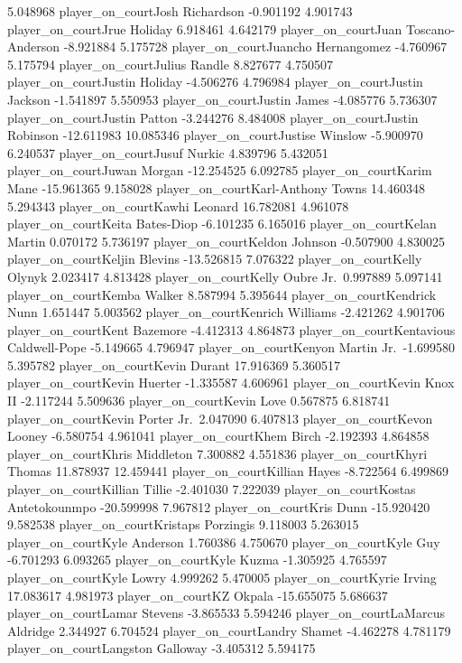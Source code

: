 \documentclass[
  landscape]{article}
\begin{document}
5.048968 player\_on\_courtJosh Richardson -0.901192 4.901743
player\_on\_courtJrue Holiday 6.918461 4.642179 player\_on\_courtJuan
Toscano-Anderson -8.921884 5.175728 player\_on\_courtJuancho Hernangomez
-4.760967 5.175794 player\_on\_courtJulius Randle 8.827677 4.750507
player\_on\_courtJustin Holiday -4.506276 4.796984
player\_on\_courtJustin Jackson -1.541897 5.550953
player\_on\_courtJustin James -4.085776 5.736307 player\_on\_courtJustin
Patton -3.244276 8.484008 player\_on\_courtJustin Robinson -12.611983
10.085346 player\_on\_courtJustise Winslow -5.900970 6.240537
player\_on\_courtJusuf Nurkic 4.839796 5.432051 player\_on\_courtJuwan
Morgan -12.254525 6.092785 player\_on\_courtKarim Mane -15.961365
9.158028 player\_on\_courtKarl-Anthony Towns 14.460348 5.294343
player\_on\_courtKawhi Leonard 16.782081 4.961078 player\_on\_courtKeita
Bates-Diop -6.101235 6.165016 player\_on\_courtKelan Martin 0.070172
5.736197 player\_on\_courtKeldon Johnson -0.507900 4.830025
player\_on\_courtKeljin Blevins -13.526815 7.076322
player\_on\_courtKelly Olynyk 2.023417 4.813428 player\_on\_courtKelly
Oubre Jr.~0.997889 5.097141 player\_on\_courtKemba Walker 8.587994
5.395644 player\_on\_courtKendrick Nunn 1.651447 5.003562
player\_on\_courtKenrich Williams -2.421262 4.901706
player\_on\_courtKent Bazemore -4.412313 4.864873
player\_on\_courtKentavious Caldwell-Pope -5.149665 4.796947
player\_on\_courtKenyon Martin Jr.~-1.699580 5.395782
player\_on\_courtKevin Durant 17.916369 5.360517 player\_on\_courtKevin
Huerter -1.335587 4.606961 player\_on\_courtKevin Knox II -2.117244
5.509636 player\_on\_courtKevin Love 0.567875 6.818741
player\_on\_courtKevin Porter Jr.~2.047090 6.407813
player\_on\_courtKevon Looney -6.580754 4.961041 player\_on\_courtKhem
Birch -2.192393 4.864858 player\_on\_courtKhris Middleton 7.300882
4.551836 player\_on\_courtKhyri Thomas 11.878937 12.459441
player\_on\_courtKillian Hayes -8.722564 6.499869
player\_on\_courtKillian Tillie -2.401030 7.222039
player\_on\_courtKostas Antetokounmpo -20.599998 7.967812
player\_on\_courtKris Dunn -15.920420 9.582538 player\_on\_courtKristaps
Porzingis 9.118003 5.263015 player\_on\_courtKyle Anderson 1.760386
4.750670 player\_on\_courtKyle Guy -6.701293 6.093265
player\_on\_courtKyle Kuzma -1.305925 4.765597 player\_on\_courtKyle
Lowry 4.999262 5.470005 player\_on\_courtKyrie Irving 17.083617 4.981973
player\_on\_courtKZ Okpala -15.655075 5.686637 player\_on\_courtLamar
Stevens -3.865533 5.594246 player\_on\_courtLaMarcus Aldridge 2.344927
6.704524 player\_on\_courtLandry Shamet -4.462278 4.781179
player\_on\_courtLangston Galloway -3.405312 5.594175
\end{document}
